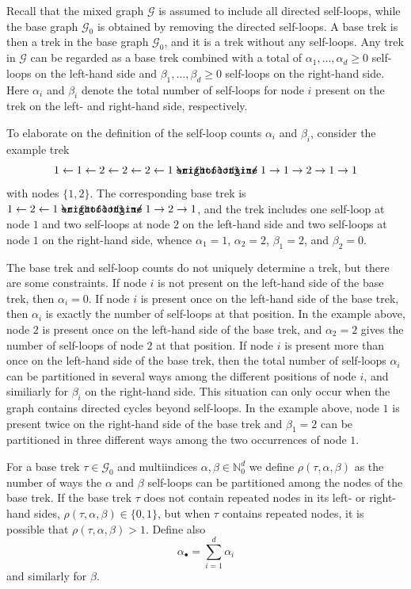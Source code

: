 \documentclass[10pt,twoside,a4paper]{amsart}
\DeclareRobustCommand{\unEdge}{%
	\mathrel{%
		\text{%
			\ooalign{$\rightfootline$\cr\reflectbox{$\rightfootline$}\cr}%
		}%
	}%
}
\begin{document}
Recall that the mixed graph $\mathcal{G}$ is assumed to include all directed 
self-loops, while the base graph $\mathcal{G}_0$ is
obtained by removing the directed self-loops. A base trek is then a trek in
the base graph $\mathcal{G}_0$, and it is a trek without any self-loops. Any 
trek in $\mathcal{G}$ can be regarded as a base trek combined with 
a total of $\alpha_1, \ldots, \alpha_d \geq 0$ self-loops on the 
left-hand side and $\beta_1, \ldots, \beta_d \geq 0$ self-loops on the 
right-hand side. Here $\alpha_i$ and $\beta_i$ denote the total 
number of self-loops for node $i$ present on the trek on the left- and 
right-hand side, respectively. 

To elaborate on the definition of the self-loop counts $\alpha_i$ and $\beta_i$,
consider the example trek 
\[
1 \leftarrow 1 \leftarrow 2 \leftarrow 2 \leftarrow 2 \leftarrow 1 \unEdge 1 \rightarrow 1 \rightarrow 2 \rightarrow 1  \rightarrow 1
\] 
with nodes $\{1, 2\}$. The corresponding base trek is
$1 \leftarrow 2 \leftarrow 1 \unEdge 1 \rightarrow 2  \rightarrow 1$, and the trek includes 
one self-loop at node $1$ and two self-loops at node $2$ on the left-hand side and two self-loops at node $1$ on the right-hand side, whence $\alpha_1 = 1$, $\alpha_2 = 2$, $\beta_1 = 2$, and $\beta_2 = 0$.

The base trek and self-loop counts do not uniquely determine a trek, but 
there are some constraints. If node $i$ is not present on the left-hand 
side of the base trek, then $\alpha_i = 0$. If node $i$ is present 
once on the left-hand side of the base trek, then $\alpha_i$ is exactly the 
number of self-loops at that position. In the example above, node $2$ is 
present once on the left-hand side of the base trek, and $\alpha_2 = 2$ 
gives the number of self-loops of node $2$ at that position.
If node $i$ is present more than once on the 
left-hand side of the base trek, then the total number of self-loops 
$\alpha_i$ can be partitioned in several ways among the different positions 
of node $i$, and similiarly for $\beta_i$ on the right-hand side.
This situation can only occur when the graph contains directed cycles beyond self-loops.
In the example above, node $1$ is 
present twice on the right-hand side of the base trek and $\beta_1 = 2$
can be partitioned in three different ways among the two occurrences of node $1$.

For a base trek $\tau \in \mathcal{G}_0$ and multiindices 
$\alpha, \beta \in \mathbb{N}_0^d$ we define $\rho(\tau, \alpha, \beta)$ 
as the number of ways the $\alpha$ and $\beta$ self-loops can be partitioned 
among the nodes of the base trek. If the base trek $\tau$ does not contain repeated nodes in 
its left- or right-hand sides, $\rho(\tau, \alpha, \beta) \in \{0, 1\}$, but 
when $\tau$ contains repeated nodes, it is possible that 
$\rho(\tau, \alpha, \beta) > 1$. Define also 
$$\alpha_{\bullet} = \sum_{i=1}^d \alpha_i$$
and similarly for $\beta$.
\end{document}
